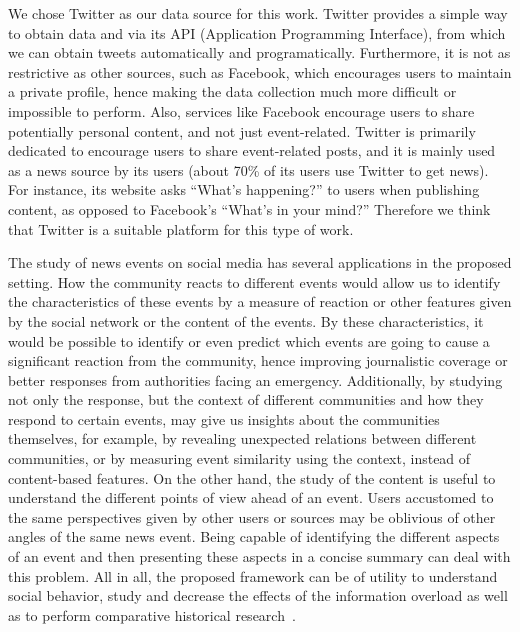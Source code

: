 \begin{intro}

We chose Twitter as our data source for this work. 
%
Twitter provides a simple way to obtain data and via its API (Application
Programming Interface), from which we can obtain tweets automatically and
programatically. 
%
Furthermore, it is not as restrictive as other sources, such as Facebook, which
encourages users to maintain a private profile, hence making the data collection
much more difficult or impossible to perform.
%
Also, services like Facebook encourage users to share potentially personal
content, and not just event-related.
%
Twitter is primarily dedicated to encourage users to share event-related posts,
and it is mainly used as a news source by its users (about 70\% of its users use
Twitter to get news). 
%
For instance, its website asks ``What's happening?'' to users when publishing
content, as opposed to Facebook's ``What's in your mind?''
%
Therefore we think that Twitter is a suitable platform for this type of work.


The study of news events on social media has several applications in the
proposed setting. 
%
How the community reacts to different events would allow us to identify the
characteristics of these events by a measure of reaction or other features given
by the social network or the content of the events. 
%
By these characteristics, it would be possible to identify or even predict which
events are going to cause a significant reaction from the community, hence
improving journalistic coverage or better responses from authorities facing an
emergency.
%
Additionally, by studying not only the response, but the context of different
communities and how they respond to certain events, may give us insights about
the communities themselves, for example, by revealing unexpected relations
between different communities, or by measuring event similarity using the
context, instead of content-based features. 
%
On the other hand, the study of the content is useful to understand the
different points of view ahead of an event. 
%
Users accustomed to the same perspectives given by other users or sources may be
oblivious of other angles of the same news event. 
%
Being capable of identifying the different aspects of an event and then presenting
these aspects in a concise summary can deal with this problem. 
%
All in all, the proposed framework can be of utility to understand social
behavior, study and decrease the effects of the information overload as well
as to perform comparative historical research~\cite{wiki:comparative}.


\end{intro}
